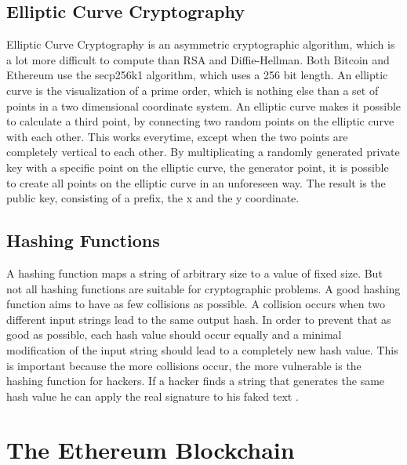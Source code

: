 \subsection{Elliptic Curve Cryptography}
Elliptic Curve Cryptography is an asymmetric cryptographic algorithm, which is a lot more difficult to compute than RSA and Diffie-Hellman. Both Bitcoin and
Ethereum use the secp256k1 algorithm, which uses a 256 bit length. An elliptic curve is the visualization of a prime order, which is nothing else than a set of
points in a two dimensional coordinate system. An elliptic curve makes it possible to calculate a third point, by connecting two random points on the elliptic
curve with each other. This works everytime, except when the two points are completely vertical to each other. By multiplicating a randomly generated private key
with a specific point on the elliptic curve, the generator point, it is possible to create all points on the elliptic curve in an unforeseen way. The result is the
public key, consisting of a prefix, the x and the y coordinate.

\subsection{Hashing Functions}
A hashing function maps a string of arbitrary size to a value of fixed size. But not all hashing functions are suitable for cryptographic problems. 
A good hashing function aims to have as few collisions as possible. A collision occurs when two different input strings lead to the same output hash.
In order to prevent that as good as possible, each hash value should occur equally and a minimal modification of the input string should lead to a
completely new hash value. This is important because the more collisions occur, the more vulnerable is the hashing function for hackers. If a hacker
finds a string that generates the same hash value he can apply the real signature to his faked text \cite{Schmeh2007}.

\section{The Ethereum Blockchain}
